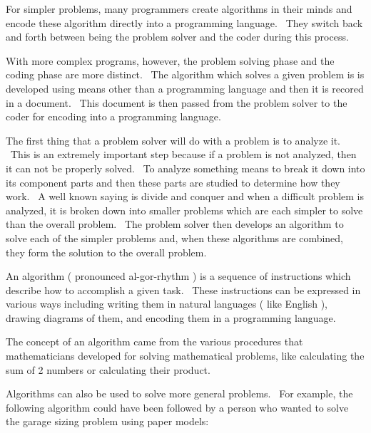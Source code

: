 \documentclass[12pt,twoside]{book}
\begin{document}
\bigskip

For simpler problems, many programmers create algorithms in their minds
and encode these algorithm directly into a programming language. \ They
switch back and forth between being the problem solver and the coder
during this process.


\bigskip

With more complex programs, however, the problem solving phase and the
coding phase are more distinct. \ The algorithm which solves a given
problem is is developed using means other than a programming language
and then it is recored in a document. \ This document is then passed
from the problem solver to the coder for encoding into a programming
language.


\bigskip

The first thing that a problem solver will do with a problem is to
analyze it. \ This is an extremely important step because if a problem
is not analyzed, then it can not be properly solved. \ To analyze
something means to break it down into its component parts and then
these parts are studied to determine how they work. \ A well known
saying is {\textquotesingle}divide and conquer{\textquotesingle} and
when a difficult problem is analyzed, it is broken down into smaller
problems which are each simpler to solve than the overall problem.
\ The problem solver then develops an algorithm to solve each of the
simpler problems and, when these algorithms are combined, they form the
solution to the overall problem.


\bigskip

An algorithm ( pronounced al{}-gor{}-rhythm ) is a sequence of
instructions which describe how to accomplish a given task. \ These
instructions can be expressed in various ways including writing them in
natural languages ( like English ), drawing diagrams of them, and
encoding them in a programming language. \ 


\bigskip

The concept of an algorithm came from the various procedures that
mathematicians developed for solving mathematical problems, like
calculating the sum of 2 numbers or calculating their product.


\bigskip

Algorithms can also be used to solve more general problems. \ For
example, the following algorithm could have been followed by a person
who wanted to solve the garage sizing problem using paper models:


\bigskip
\end{document}
